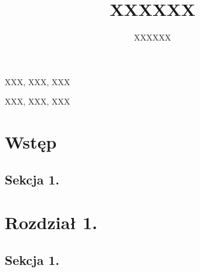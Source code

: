 \documentclass{eiti/eiti-mgr}
\begin{document}
\title{XXXXXX}
\author{XXXXXX}
\date{\the\year}
\maketitle

\streszczenie \lipsum[1-4]
\slowakluczowe XXX, XXX, XXX
\newpage

\abstract \lipsum[1-4]
\keywords XXX, XXX, XXX
\newpage

\makeauthorship
\newpage

\tableofcontents
\newpage


\chapter{Wstęp}
\lipsum[1-4]
\section{Sekcja 1.}
\lipsum[1-10]

\chapter{Rozdział 1.}
\lipsum[1-4]
\section{Sekcja 1.}
\lipsum[1-10]



\listoffigures

\listoftables
\end{document}
